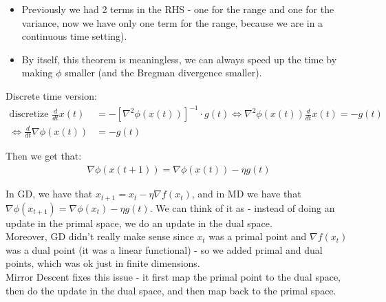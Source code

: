 \documentclass[11pt]{book} %
\begin{document}
\begin{itemize}
    \item Previously we had 2 terms in the RHS - one for the range and one for the variance, 
    now we have only one term for the range, because we are in a continuous time setting).
    \item By itself, this theorem is meaningless, we can always speed up the time by making $\phi$ smaller (and the Bregman divergence smaller).
\end{itemize}

Discrete time version: \\
\begin{align*}
    \text{discretize } \frac{d}{dt} x(t) &= -[\nabla^2 \phi(x(t))]^{-1} \cdot g(t) \iff \nabla^2 \phi(x(t)) \frac{d}{dt} x(t) = -g(t) \\
    \iff \frac{d}{dt} \nabla \phi(x(t)) &= -g(t)
\end{align*}

Then we get that:
\begin{align*}
    \nabla \phi(x(t+1)) = \nabla \phi(x(t)) - \eta g(t)
\end{align*}

In GD, we have that $x_{t+1} = x_t - \eta \nabla f(x_t)$, and in MD we have that $\nabla \phi(x_{t+1}) = \nabla \phi(x_t) - \eta g(t)$.
We can think of it as - instead of doing an update in the primal space, we do an update in the dual space. \\
Moreover, GD didn't really make sense since $x_t$ was a primal point and $\nabla f(x_t)$ was a dual point (it was a linear functional) - 
so we added primal and dual points, which was ok just in finite dimensions. \\
Mirror Descent fixes this issue - it first map the primal point to the dual space, then do the update in the dual space, and then map back to the primal space.




\end{document}
